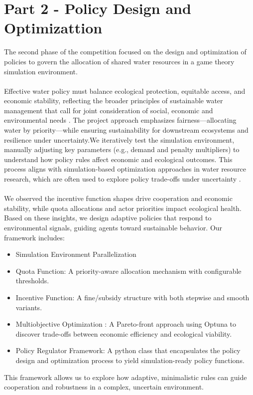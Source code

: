 \documentclass[ruler]{CUP-JNL-EDS}%
\begin{document}
\section{Part 2 - Policy Design and Optimizattion}
The second phase of the competition focused on the design and optimization of policies to govern the 
allocation of shared water resources in a game theory simulation environment.
\\ \\
Effective water policy must balance ecological protection, equitable access, and economic stability, reflecting 
the broader principles of sustainable water management that call for joint consideration of social, economic and environmental 
needs \citep{wang2025}. 
The project approach emphasizes fairness—allocating water by priority—while ensuring sustainability for downstream ecosystems and resilience 
under uncertainty.We iteratively test the simulation environment, manually adjusting key parameters (e.g., demand and penalty multipliers) 
to understand how policy rules affect economic and ecological outcomes. This process aligns with simulation-based optimization approaches in 
water resource research, which are often used to explore policy trade-offs under uncertainty \citep{tian2019,tang2021,fu2020}. 
\\ \\
We observed the incentive function shapes drive cooperation and economic stability, while quota allocations and actor priorities impact ecological health.
Based on these insights, we design adaptive policies that respond to environmental signals, guiding agents toward 
sustainable behavior. Our framework includes:
\begin{itemize}
    \item Simulation Environment Parallelization
    \item Quota Function: A priority-aware allocation mechanism with configurable thresholds.
    \item Incentive Function: A fine/subsidy structure with both stepwise and smooth variants.
    \item Multiobjective Optimization : A Pareto-front approach using Optuna to discover trade-offs between economic efficiency and ecological viability.
    \item Policy Regulator Framework: A python class that encapsulates the policy design and optimization process to yield simulation-ready policy functions.  
\end{itemize}
\noindent This framework allows us to explore how adaptive, minimalistic rules can guide cooperation and robustness in a complex, uncertain environment.
\end{document}
